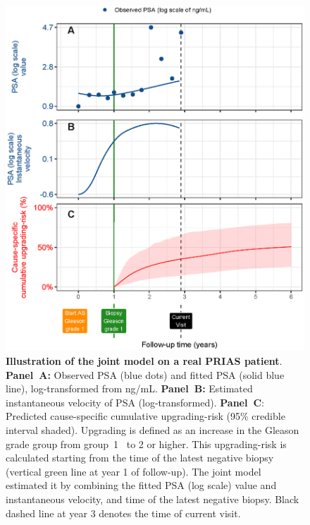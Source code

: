 \begin{figure}
\centerline{\includegraphics[width=\columnwidth]{images/jmExplanationPlot_113.eps}}
\caption{\textbf{Illustration of the joint model on a real PRIAS patient}. \textbf{Panel~A:} Observed PSA (blue dots) and fitted PSA (solid blue line), log-transformed from ng/mL. \textbf{Panel~B:} Estimated instantaneous velocity of PSA (log-transformed). \textbf{Panel~C}: Predicted cause-specific cumulative upgrading-risk (95\% credible interval shaded). Upgrading is defined as an increase in the Gleason grade group from group~1~\citep{epsteinGG2014} to 2 or higher. This upgrading-risk is calculated starting from the time of the latest negative biopsy (vertical green line at year 1 of follow-up). The joint model estimated it by combining the fitted PSA (log scale) value and instantaneous velocity, and time of the latest negative biopsy. Black dashed line at year 3 denotes the time of current visit.}
\label{fig:jmExplanationPlot_113}
\end{figure}

